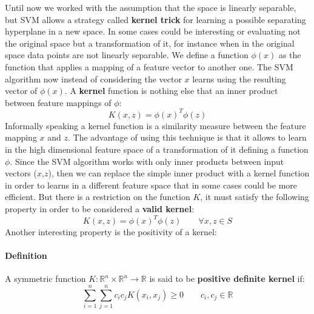 \documentclass[11pt,a4paper]{article}
\begin{document}
Until now we worked with the assumption that the space is linearly separable, but SVM allows a strategy called \textbf{kernel trick} for learning a possible separating hyperplane in a new space.
In some cases could be interesting or evaluating not the original space but a transformation of it, for instance when in the original space data points are not linearly separable. We define a function $\phi(x)$ as the function that applies a mapping of a feature vector to another one. The SVM algorithm now instead of considering the vector $x$ learns using the resulting vector of $\phi(x)$. A \textbf{kernel} function is nothing else that an inner product between feature mappings of $\phi$:
$$K(x,z) = \phi(x)^T\phi(z)$$
Informally speaking a kernel function is a similarity measure between the feature mapping $x$ and $z$. 
The advantage of using this technique is that it allows to learn in the high dimensional feature space of a transformation of it defining a function $\phi$. Since the SVM algorithm works with only inner products between input vectors ($x$,$z$), then we can replace the simple inner product with a kernel function in order to learns in a different feature space that in some cases could be more efficient. But there is a restriction on the function $K$, it must satisfy the following property in order to be considered a \textbf{valid kernel}:
$$K(x,z) = \phi(x)^T\phi(z) \qquad \forall x, z \in S$$
\newpage
Another interesting property is the positivity of a kernel:
\paragraph{Definition} 
A symmetric function  $K: \mathbb{R}^n\times\mathbb{R}^n \rightarrow \mathbb{R}$ is said to be \textbf{positive definite kernel} if:
$$\sum_{i=1}^n \sum_{j=1}^n c_i c_j K(x_i, x_j) \geq 0	\qquad c_i,c_j \in \mathbb{R}$$
\end{document}
